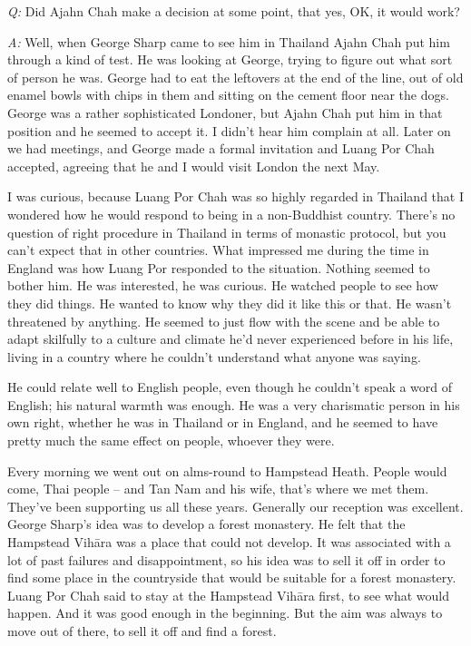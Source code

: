 \emph{Q:} Did Ajahn Chah make a decision at some point, that yes, OK, it
would work? 

\emph{A:} Well, when George Sharp came to see him in Thailand Ajahn Chah
put him through a kind of test. He was looking at George, trying to
figure out what sort of person he was. George had to eat the leftovers
at the end of the line, out of old enamel bowls with chips in them and
sitting on the cement floor near the dogs. George was a rather
sophisticated Londoner, but Ajahn Chah put him in that position and he
seemed to accept it. I didn't hear him complain at all. Later on we had
meetings, and George made a formal invitation and Luang Por Chah
accepted, agreeing that he and I would visit London the next May. 

I was curious, because Luang Por Chah was so highly regarded in Thailand
that I wondered how he would respond to being in a non-Buddhist country. 
There's no question of right procedure in Thailand in terms of monastic
protocol, but you can't expect that in other countries. What impressed
me during the time in England was how Luang Por responded to the
situation. Nothing seemed to bother him. He was interested, he was
curious. He watched people to see how they did things. He wanted to know
why they did it like this or that. He wasn't threatened by anything. He
seemed to just flow with the scene and be able to adapt skilfully to a
culture and climate he'd never experienced before in his life, living in
a country where he couldn't understand what anyone was saying. 

He could relate well to English people, even though he couldn't speak a
word of English; his natural warmth was enough. He was a very
charismatic person in his own right, whether he was in Thailand or in
England, and he seemed to have pretty much the same effect on people, 
whoever they were. 

Every morning we went out on alms-round to Hampstead Heath. People would
come, Thai people -- and Tan Nam and his wife, that's where we met them. 
They've been supporting us all these years. Generally our reception was
excellent. George Sharp's idea was to develop a forest monastery. He
felt that the Hampstead Vihāra was a place that could not develop. It
was associated with a lot of past failures and disappointment, so his
idea was to sell it off in order to find some place in the countryside
that would be suitable for a forest monastery. Luang Por Chah said to
stay at the Hampstead Vihāra first, to see what would happen. And it was
good enough in the beginning. But the aim was always to move out of
there, to sell it off and find a forest. 

